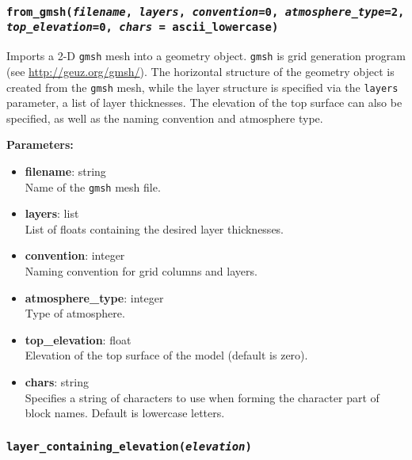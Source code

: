 \begin{snugshade}\subsubsection{\texttt{from\_gmsh(\emph{filename}, \emph{layers}, \emph{convention}=0, \emph{atmosphere\_type}=2,\\
    \emph{top\_elevation}=0, \emph{chars} = ascii\_lowercase)}}\end{snugshade}
\label{sec:mulgrid:from_gmsh}

Imports a 2-D \texttt{gmsh} mesh into a geometry object.  \texttt{gmsh} is grid generation program (see \url{http://geuz.org/gmsh/}).  The horizontal structure of the geometry object is created from the \texttt{gmsh} mesh, while the layer structure is specified via the \texttt{layers} parameter, a list of layer thicknesses.  The elevation of the top surface can also be specified, as well as the naming convention and atmosphere type.

\textbf{Parameters:}
\begin{itemize}
\item \textbf{filename}: string\\
  Name of the \texttt{gmsh} mesh file.
\item \textbf{layers}: list\\
  List of floats containing the desired layer thicknesses.
\item \textbf{convention}: integer\\
  Naming convention for grid columns and layers.
\item \textbf{atmosphere\_type}: integer\\
  Type of atmosphere.
\item \textbf{top\_elevation}: float\\
  Elevation of the top surface of the model (default is zero).
\item \textbf{chars}: string\\
  Specifies a string of characters to use when forming the character part of block names.  Default is lowercase letters.
\end{itemize}

\begin{snugshade}\subsubsection{\texttt{layer\_containing\_elevation(\emph{elevation})}}\end{snugshade}
\label{sec:mulgrid:layer_containing_elevation}

